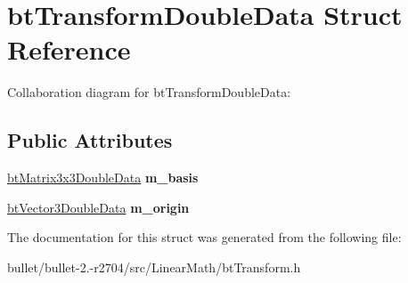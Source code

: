 \hypertarget{structbt_transform_double_data}{\section{bt\+Transform\+Double\+Data Struct Reference}
\label{structbt_transform_double_data}
}


Collaboration diagram for bt\+Transform\+Double\+Data\+:
\subsection*{Public Attributes}
\begin{DoxyCompactItemize}
\item 
\hypertarget{structbt_transform_double_data_a7f05735527469df9cb683c8651931e31}{\hyperlink{structbt_matrix3x3_double_data}{bt\+Matrix3x3\+Double\+Data} {\bfseries m\+\_\+basis}}\label{structbt_transform_double_data_a7f05735527469df9cb683c8651931e31}

\item 
\hypertarget{structbt_transform_double_data_a217df5931853c98dc3a53fd6f8715ac4}{\hyperlink{structbt_vector3_double_data}{bt\+Vector3\+Double\+Data} {\bfseries m\+\_\+origin}}\label{structbt_transform_double_data_a217df5931853c98dc3a53fd6f8715ac4}

\end{DoxyCompactItemize}


The documentation for this struct was generated from the following file\+:\begin{DoxyCompactItemize}
\item 
bullet/bullet-\/2.-\/r2704/src/\+Linear\+Math/bt\+Transform.\+h\end{DoxyCompactItemize}
